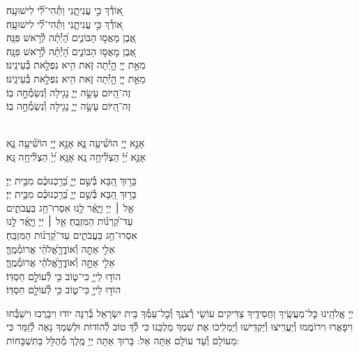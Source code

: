 \documentclass[twoside, openany, parskip=half, 11pt]{book}
\begin{document}
{\begin{narrow}
א֭וֹדְ֯ךָ כִּ֣י עֲנִיתָ֑נִי \hfill וַתְּ֯הִי־לִ֗֝י לִישׁוּעָֽה׃ \\
\scriptsize{ א֭וֹדְ֯ךָ כִּ֣י עֲנִיתָ֑נִי \hfill וַתְּ֯הִי־לִ֗֝י לִישׁוּעָֽה׃ \\}\normalsize{}
אֶ֭בֶן מָאֲס֣וּ הַבּוֹנִ֑ים \hfill הָ֝יְ֯תָ֗ה לְ֯רֹ֣אשׁ פִּנָּֽה׃ \\
\scriptsize{ אֶ֭בֶן מָאֲס֣וּ הַבּוֹנִ֑ים \hfill הָ֝יְ֯תָ֗ה לְ֯רֹ֣אשׁ פִּנָּֽה׃ \\}\normalsize{}
מֵאֵ֣ת יְיָ֭ הָ֣יְ֯תָה זֹּ֑את \hfill הִ֖יא נִפְלָ֣את בְּ֯עֵינֵֽינוּ׃ \\
\scriptsize{ מֵאֵ֣ת יְיָ֭ הָ֣יְ֯תָה זֹּ֑את \hfill הִ֖יא נִפְלָ֣את בְּ֯עֵינֵֽינוּ׃ \\}\normalsize{}
זֶה־הַ֭יּוֹם עָשָׂ֣ה יְיָ֑ \hfill נָגִ֖ילָה וְ֯נִשְׂמְ֯חָ֣ה בֽוֹ׃ \\
\scriptsize{ זֶה־הַ֭יּוֹם עָשָׂ֣ה יְיָ֑ \hfill נָגִ֖ילָה וְ֯נִשְׂמְ֯חָ֣ה בֽוֹ׃ } \normalsize{}


\\
אָנָּ֣א יְיָ֭ הוֹשִׁ֘יעָ֥ה נָּ֑א \hfill \scriptsize{אָנָּ֣א יְיָ֭ הוֹשִׁ֘יעָ֥ה נָּ֑א}\\ \normalsize
אָנָּ֥א יְ֝יָ֗ הַצְלִ֘יחָ֥ה נָּֽא \hfill \scriptsize{ אָנָּ֥א יְ֝יָ֗ הַצְלִ֘יחָ֥ה נָּֽא׃}\\ \normalsize


בָּר֣וּךְ הַ֭בָּא בְּ֯שֵׁ֣ם יְיָ֑ \hfill בֵּ֝רַ֥כְנוּכֶ֗ם מִבֵּ֥ית יְיָ׃\\
\scriptsize{בָּר֣וּךְ הַ֭בָּא בְּ֯שֵׁ֣ם יְיָ֑ \hfill בֵּ֝רַ֥כְנוּכֶ֗ם מִבֵּ֥ית יְיָ׃}\\
\normalsize{אֵ֤ל ׀ יְיָ וַיָּ֢אֶ֫ר לָ֥נוּ \hfill אִסְרוּ־חַ֥ג בַּעֲבֹתִ֑ים \\ עַד־קַ֝רְנ֗וֹת הַמִּזְבֵּֽחַ׃ \hfill }
\scriptsize{אֵ֤ל ׀ יְיָ וַיָּ֢אֶ֫ר לָ֥נוּ \\ אִסְרוּ־חַ֥ג בַּעֲבֹתִ֑ים \hfill עַד־קַ֝רְנ֗וֹת הַמִּזְבֵּֽחַ׃}\\
\normalsize{אֵלִ֣י אַתָּ֣ה וְ֯אוֹדֶ֑ךָּ\hfill אֱ֝לֹהַ֗י אֲרוֹמְ֯מֶֽךָּ׃}\\
\scriptsize{אֵלִ֣י אַתָּ֣ה וְ֯אוֹדֶ֑ךָּ\hfill אֱ֝לֹהַ֗י אֲרוֹמְ֯מֶֽךָּ׃}\\
\normalsize{הוֹד֣וּ לַייָ֣ כִּי־ט֑וֹב \hfill כִּ֖י לְ֯עוֹלָ֣ם חַסְדּֽוֹ׃ }\\
\scriptsize{הוֹד֣וּ לַייָ֣ כִּי־ט֑וֹב \hfill כִּ֖י לְ֯עוֹלָ֣ם חַסְדּֽוֹ׃ } \\
\normalsize{}

\end{narrow}

\negline

יְיָ אֱלֹהֵֽינוּ כׇּל־מַעֲשֶֽׂיךָ וַחֲסִידֶֽיךָ צַדִּיקִים עוֹשֵׂי רְ֯צֹנֶֽךָ וְ֯כׇל־עַמְּ֯ךָ בֵּית יִשְׂרָאֵל בְּ֯רִנָּה יוֹדוּ וִיבָרֲכוּ וִישַׁבְּ֯חוּ וִיפָאֲרוּ וִירוֹמֲמוּ וְ֯יַעֲרִֽיצוּ וְ֯יַקְדִּֽישׁוּ וְ֯יַמְלִֽיכוּ אֶת שִׁמְךָ מַלְכֵּֽנוּ כִּי לְ֯ךָ טוֹב לְ֯הוֹדוֹת וּלְשִׁמְךָ נָאֶה לְ֯זַמֵּר כִּי מֵעוֹלָם וְ֯עַד עוֹלָם אַתָּה אֵל: בָּרוּךְ אַתָּה יְיָ מֶֽלֶךְ מְ֯הֻלָּל בַּתִּשְׁבָּחוֹת:
}
\end{document}
